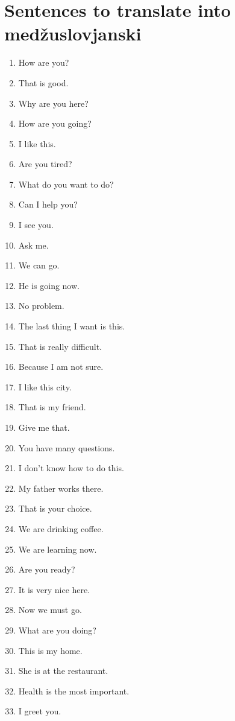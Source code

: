 \documentclass{article}
\begin{document}
\section*{Sentences to translate into medžuslovjanski}
\begin{enumerate}
    \item How are you?  
    \item That is good.  
    \item Why are you here?  
    \item How are you going?  
    \item I like this.  
    \item Are you tired?  
    \item What do you want to do?  
    \item Can I help you?  
    \item I see you.  
    \item Ask me.  
    \item We can go.  
    \item He is going now.  
    \item No problem.  
    \item The last thing I want is this.  
    \item That is really difficult.  
    \item Because I am not sure.  
    \item I like this city.  
    \item That is my friend.  
    \item Give me that.  
    \item You have many questions.  
    \item I don't know how to do this.  
    \item My father works there.  
    \item That is your choice.  
    \item We are drinking coffee.  
    \item We are learning now.  
    \item Are you ready?  
    \item It is very nice here.  
    \item Now we must go.  
    \item What are you doing?  
    \item This is my home.  
    \item She is at the restaurant.  
    \item Health is the most important.  
    \item I greet you.  

\end{enumerate}
\end{document}
